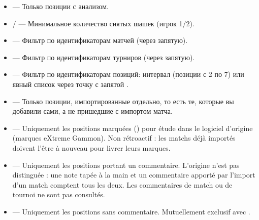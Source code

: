 \documentclass[letterpaper,10pt,russian]{sphinxmanual}
\begin{document}
\begin{itemize}
\item {} 
\sphinxAtStartPar
{} — Только позиции с анализом.

\item {} 
\sphinxAtStartPar
{} /  — Минимальное количество снятых шашек (игрок 1/2).

\item {} 
\sphinxAtStartPar
{} — Фильтр по идентификаторам матчей (через запятую).

\item {} 
\sphinxAtStartPar
{} — Фильтр по идентификаторам турниров (через запятую).

\item {} 
\sphinxAtStartPar
{} — Фильтр по идентификаторам позиций: интервал  (позиции с 2 по 7) или явный список через точку с запятой .

\item {} 
\sphinxAtStartPar
{} — Только позиции, импортированные отдельно, то есть те, которые вы добавили сами, а не пришедшие с импортом матча.

\item {} 
\sphinxAtStartPar
{} — Uniquement les positions marquées () pour étude dans
le logiciel d’origine (marques eXtreme Gammon). Non rétroactif : les
matchs déjà importés doivent l’être à nouveau pour livrer leurs marques.

\item {} 
\sphinxAtStartPar
{} — Uniquement les positions portant un commentaire.
L’origine n’est pas distinguée : une note tapée à la main et un commentaire
apporté par l’import d’un match comptent tous les deux. Les commentaires de
match ou de tournoi ne sont pas consultés.

\item {} 
\sphinxAtStartPar
{} — Uniquement les positions sans commentaire. Mutuellement
exclusif avec .

\end{itemize}
\end{document}
